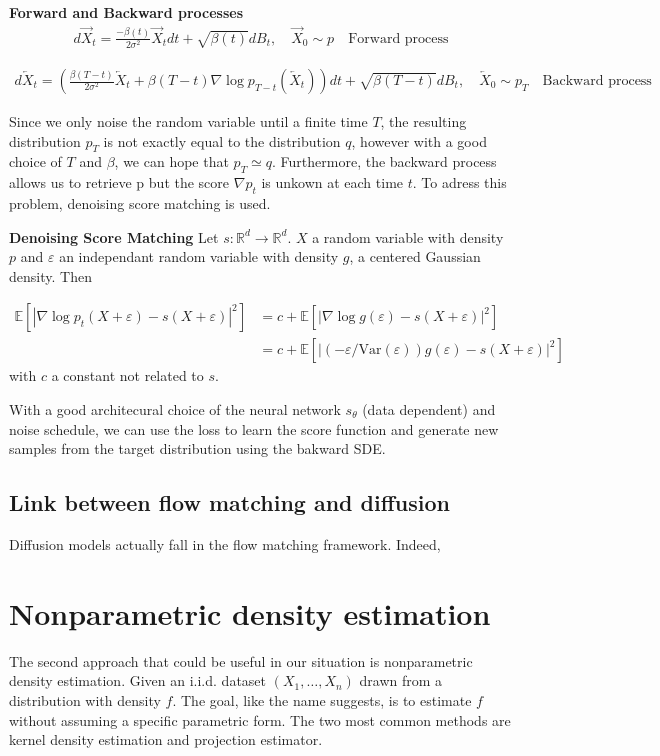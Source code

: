 \documentclass{article}
\begin{document}
\textbf{Forward and Backward processes}
\begin{align}
    d\overrightarrow{X}_t = \frac{-\beta(t)}{2\sigma^2}\overrightarrow{X}_t dt + \sqrt{\beta(t)}dB_t, \quad \overrightarrow{X}_0\sim p 
    \quad \text{Forward process}
\end{align} 

\begin{align}
    d\overleftarrow{X}_t=\left(  \frac{\beta(T-t)}{2\sigma^2}\overleftarrow{X}_t+\beta(T-t)\nabla\log p_{T-t}\left(\overleftarrow{X}_t \right)  \right)dt + \sqrt{\beta(T-t)}dB_t, \quad \overleftarrow{X}_0\sim p_T \quad \text{Backward process}
\end{align}

Since we only noise the random variable until a finite time \(T\), the resulting distribution \(p_T\) is not exactly equal to the distribution \(q\), however with a good choice of \(T\) and \(\beta\), we can hope that \(p_T\simeq q\). Furthermore, the backward process allows us to retrieve p but the score \(\nabla p_t\) is unkown at each time \(t\). To adress this problem, denoising score matching is used.  

\bigskip
\textbf{Denoising Score Matching} \newline
Let \(s:\mathbb{R}^d\rightarrow\mathbb{R}^d\). \(X\) a random variable with density \(p\) and \(\varepsilon\) an independant random variable with density \(g\), a centered Gaussian density. Then 

\begin{align}
    \mathbb{E}[|\nabla \log p_t (X+\varepsilon)-s(X+\varepsilon)|^2]&=c+\mathbb{E}[|\nabla \log g(\varepsilon)-s(X+\varepsilon)|^2]\\
    &=c+\mathbb{E}[|(-\varepsilon/\text{Var} (\varepsilon))g(\varepsilon)-s(X+\varepsilon)|^2]
\end{align}
with \(c\) a constant not related to \(s\).

With a good architecural choice of the neural network \(s_\theta\) (data dependent) and noise schedule, we can use the loss to learn the score function and generate new samples from the target distribution using the bakward SDE.

\subsection{Link between flow matching and diffusion}
Diffusion models actually fall in the flow matching framework. Indeed, 

\section{Nonparametric density estimation}
The second approach that could be useful in our situation is nonparametric density estimation. Given an i.i.d. dataset \((X_1,\ldots,X_n)\) drawn from a distribution with density \(f\). The goal, like the name suggests, is to estimate \(f\) without assuming a specific parametric form. The two most common methods are kernel density estimation and projection estimator. 
\end{document}
